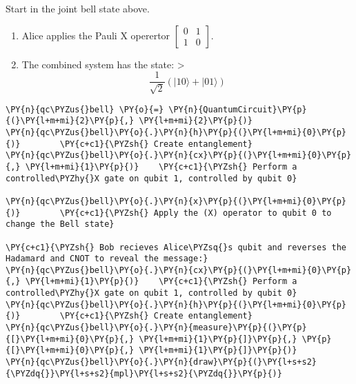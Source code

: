 Start in the joint bell state above.

\begin{enumerate}
\def\labelenumi{\arabic{enumi}.}
\tightlist
\item
  Alice applies the Pauli X operertor
  \(\begin{bmatrix} 0 & 1 \\ 1 & 0 \end{bmatrix}\).
\item
  The combined system has the state: \textgreater{}
  \[\frac{1}{\sqrt{2}}(\lvert 10\rangle + \lvert 01\rangle)\]
\end{enumerate}

    \begin{tcolorbox}[breakable, size=fbox, boxrule=1pt, pad at break*=1mm,colback=cellbackground, colframe=cellborder]
\begin{Verbatim}[commandchars=\\\{\}]
\PY{n}{qc\PYZus{}bell} \PY{o}{=} \PY{n}{QuantumCircuit}\PY{p}{(}\PY{l+m+mi}{2}\PY{p}{,} \PY{l+m+mi}{2}\PY{p}{)}
\PY{n}{qc\PYZus{}bell}\PY{o}{.}\PY{n}{h}\PY{p}{(}\PY{l+m+mi}{0}\PY{p}{)}        \PY{c+c1}{\PYZsh{} Create entanglement}
\PY{n}{qc\PYZus{}bell}\PY{o}{.}\PY{n}{cx}\PY{p}{(}\PY{l+m+mi}{0}\PY{p}{,} \PY{l+m+mi}{1}\PY{p}{)}    \PY{c+c1}{\PYZsh{} Perform a controlled\PYZhy{}X gate on qubit 1, controlled by qubit 0}

\PY{n}{qc\PYZus{}bell}\PY{o}{.}\PY{n}{x}\PY{p}{(}\PY{l+m+mi}{0}\PY{p}{)}        \PY{c+c1}{\PYZsh{} Apply the (X) operator to qubit 0 to change the Bell state}

\PY{c+c1}{\PYZsh{} Bob recieves Alice\PYZsq{}s qubit and reverses the Hadamard and CNOT to reveal the message:}
\PY{n}{qc\PYZus{}bell}\PY{o}{.}\PY{n}{cx}\PY{p}{(}\PY{l+m+mi}{0}\PY{p}{,} \PY{l+m+mi}{1}\PY{p}{)}    \PY{c+c1}{\PYZsh{} Perform a controlled\PYZhy{}X gate on qubit 1, controlled by qubit 0}
\PY{n}{qc\PYZus{}bell}\PY{o}{.}\PY{n}{h}\PY{p}{(}\PY{l+m+mi}{0}\PY{p}{)}        \PY{c+c1}{\PYZsh{} Create entanglement}
\PY{n}{qc\PYZus{}bell}\PY{o}{.}\PY{n}{measure}\PY{p}{(}\PY{p}{[}\PY{l+m+mi}{0}\PY{p}{,} \PY{l+m+mi}{1}\PY{p}{]}\PY{p}{,} \PY{p}{[}\PY{l+m+mi}{0}\PY{p}{,} \PY{l+m+mi}{1}\PY{p}{]}\PY{p}{)}
\PY{n}{qc\PYZus{}bell}\PY{o}{.}\PY{n}{draw}\PY{p}{(}\PY{l+s+s2}{\PYZdq{}}\PY{l+s+s2}{mpl}\PY{l+s+s2}{\PYZdq{}}\PY{p}{)}
\end{Verbatim}
\end{tcolorbox}
 
            
    
